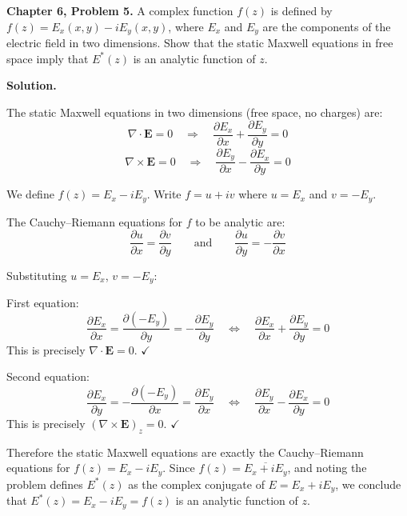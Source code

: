 \documentclass[12pt]{article}
\begin{document}
\textbf{Chapter 6, Problem 5.} A complex function $f(z)$ is defined by $f(z) = E_x(x,y) - iE_y(x,y)$, where $E_x$ and $E_y$ are the components of the electric field in two dimensions. Show that the static Maxwell equations in free space imply that $E^*(z)$ is an analytic function of $z$.

\bigskip
\textbf{Solution.}

The static Maxwell equations in two dimensions (free space, no charges) are:
\[
\nabla \cdot \mathbf{E} = 0 \quad \Rightarrow \quad \frac{\partial E_x}{\partial x} + \frac{\partial E_y}{\partial y} = 0
\]
\[
\nabla \times \mathbf{E} = 0 \quad \Rightarrow \quad \frac{\partial E_y}{\partial x} - \frac{\partial E_x}{\partial y} = 0
\]

We define $f(z) = E_x - iE_y$. Write $f = u + iv$ where $u = E_x$ and $v = -E_y$.

The Cauchy--Riemann equations for $f$ to be analytic are:
\[
\frac{\partial u}{\partial x} = \frac{\partial v}{\partial y} \qquad \text{and} \qquad \frac{\partial u}{\partial y} = -\frac{\partial v}{\partial x}
\]

Substituting $u = E_x$, $v = -E_y$:

First equation:
\[
\frac{\partial E_x}{\partial x} = \frac{\partial(-E_y)}{\partial y} = -\frac{\partial E_y}{\partial y}
\quad \Leftrightarrow \quad
\frac{\partial E_x}{\partial x} + \frac{\partial E_y}{\partial y} = 0
\]
This is precisely $\nabla \cdot \mathbf{E} = 0$. $\checkmark$

Second equation:
\[
\frac{\partial E_x}{\partial y} = -\frac{\partial(-E_y)}{\partial x} = \frac{\partial E_y}{\partial x}
\quad \Leftrightarrow \quad
\frac{\partial E_y}{\partial x} - \frac{\partial E_x}{\partial y} = 0
\]
This is precisely $(\nabla \times \mathbf{E})_z = 0$. $\checkmark$

Therefore the static Maxwell equations are exactly the Cauchy--Riemann equations for $f(z) = E_x - iE_y$. Since $f(z) = \overline{E_x + iE_y}$, and noting the problem defines $E^*(z)$ as the complex conjugate of $E = E_x + iE_y$, we conclude that $E^*(z) = E_x - iE_y = f(z)$ is an analytic function of $z$.
\end{document}
